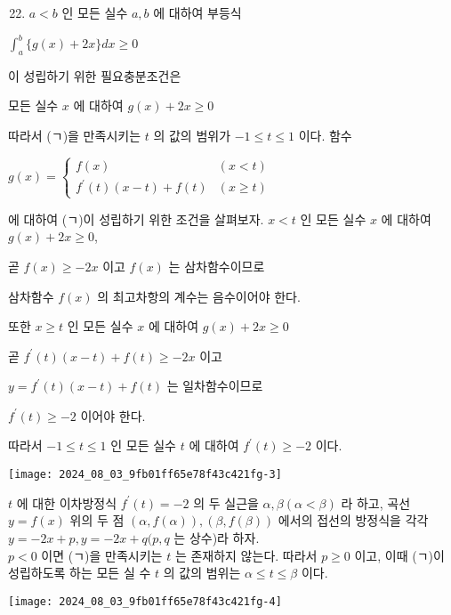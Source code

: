 \documentclass[10pt]{article}
\begin{document}
\begin{enumerate}
  \setcounter{enumi}{21}
  \item \(a<b\) 인 모든 실수 \(a, b\) 에 대하여 부등식
\end{enumerate}

\(\int_{a}^{b}\{g(x)+2 x\} d x \geq 0\)

이 성립하기 위한 필요충분조건은

모든 실수 \(x\) 에 대하여 \(g(x)+2 x \geq 0\)

따라서 (ㄱ)을 만족시키는 \(t\) 의 값의 범위가 \(-1 \leq t \leq 1\) 이다. 함수

\(g(x)= \begin{cases}f(x) & (x<t) \\ f^{\prime}(t)(x-t)+f(t) & (x \geq t)\end{cases}\)

에 대하여 (ㄱ)이 성립하기 위한 조건을 살펴보자. \(x<t\) 인 모든 실수 \(x\) 에 대하여 \(g(x)+2 x \geq 0\),

곧 \(f(x) \geq-2 x\) 이고 \(f(x)\) 는 삼차함수이므로

삼차함수 \(f(x)\) 의 최고차항의 계수는 음수이어야 한다.

또한 \(x \geq t\) 인 모든 실수 \(x\) 에 대하여 \(g(x)+2 x \geq 0\)

곧 \(f^{\prime}(t)(x-t)+f(t) \geq-2 x\) 이고

\(y=f^{\prime}(t)(x-t)+f(t)\) 는 일차함수이므로

\(f^{\prime}(t) \geq-2\) 이어야 한다.

따라서 \(-1 \leq t \leq 1\) 인 모든 실수 \(t\) 에 대하여 \(f^{\prime}(t) \geq-2\) 이다.

\begin{center}
\texttt{[image: 2024\_08\_03\_9fb01ff65e78f43c421fg-3]}
\end{center}

\(t\) 에 대한 이차방정식 \(f^{\prime}(t)=-2\) 의 두 실근을 \(\alpha, \beta(\alpha<\beta)\) 라 하고, 곡선 \(y=f(x)\) 위의 두 점 \((\alpha, f(\alpha)),(\beta, f(\beta))\) 에서의 접선의 방정식을 각각 \(y=-2 x+p, y=-2 x+q(p, q\) 는 상수)라 하자.\\
\(p<0\) 이면 (ㄱ)을 만족시키는 \(t\) 는 존재하지 않는다. 따라서 \(p \geq 0\) 이고, 이때 (ㄱ)이 성립하도록 하는 모든 실 수 \(t\) 의 값의 범위는 \(\alpha \leq t \leq \beta\) 이다.

\begin{center}
\texttt{[image: 2024\_08\_03\_9fb01ff65e78f43c421fg-4]}
\end{center}
\end{document}

